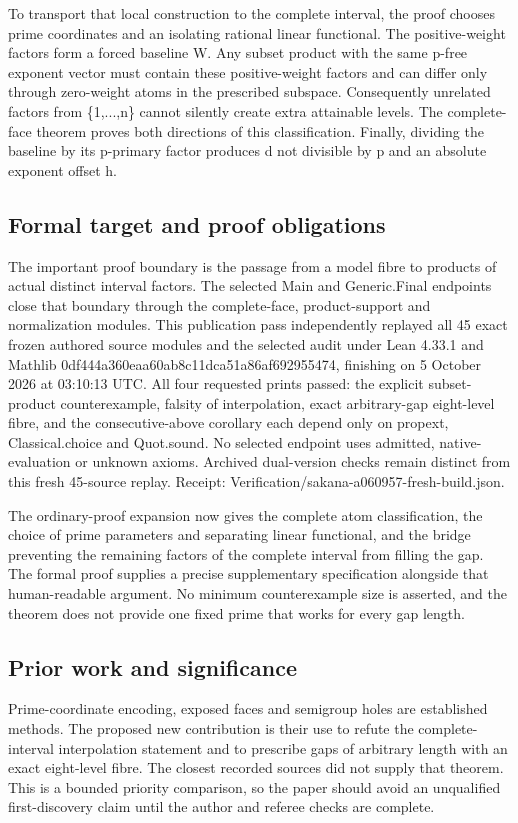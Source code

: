 \documentclass[11pt,a4paper]{article}
\begin{document}
To transport that local construction to the complete interval, the proof chooses prime coordinates and an isolating rational linear functional. The positive-weight factors form a forced baseline W. Any subset product with the same p-free exponent vector must contain these positive-weight factors and can differ only through zero-weight atoms in the prescribed subspace. Consequently unrelated factors from \{1,...,n\} cannot silently create extra attainable levels. The complete-face theorem proves both directions of this classification. Finally, dividing the baseline by its p-primary factor produces d not divisible by p and an absolute exponent offset h.

\subsection{Formal target and proof obligations}
The important proof boundary is the passage from a model fibre to products of actual distinct interval factors. The selected Main and Generic.Final endpoints close that boundary through the complete-face, product-support and normalization modules. This publication pass independently replayed all 45 exact frozen authored source modules and the selected audit under Lean 4.33.1 and Mathlib 0df444a360eaa60ab8c11dca51a86af692955474, finishing on 5 October 2026 at 03:10:13 UTC. All four requested prints passed: the explicit subset-product counterexample, falsity of interpolation, exact arbitrary-gap eight-level fibre, and the consecutive-above corollary each depend only on propext, Classical.choice and Quot.sound. No selected endpoint uses admitted, native-evaluation or unknown axioms. Archived dual-version checks remain distinct from this fresh 45-source replay. Receipt: Verification/sakana-a060957-fresh-build.json.

The ordinary-proof expansion now gives the complete atom classification, the choice of prime parameters and separating linear functional, and the bridge preventing the remaining factors of the complete interval from filling the gap. The formal proof supplies a precise supplementary specification alongside that human-readable argument. No minimum counterexample size is asserted, and the theorem does not provide one fixed prime that works for every gap length.

\subsection{Prior work and significance}
Prime-coordinate encoding, exposed faces and semigroup holes are established methods. The proposed new contribution is their use to refute the complete-interval interpolation statement and to prescribe gaps of arbitrary length with an exact eight-level fibre. The closest recorded sources did not supply that theorem. This is a bounded priority comparison, so the paper should avoid an unqualified first-discovery claim until the author and referee checks are complete.
\end{document}
